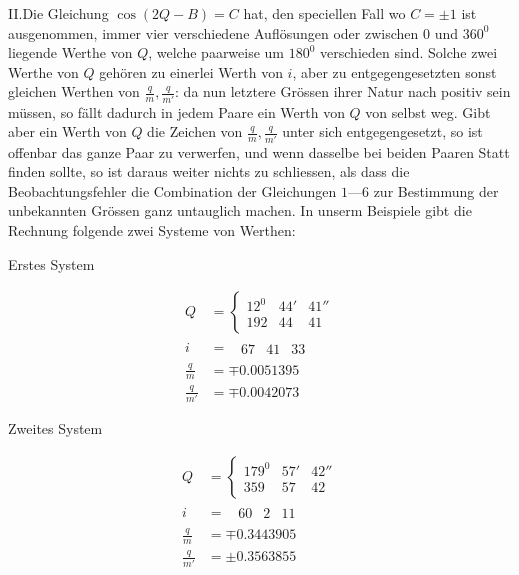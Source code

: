 \par\GaussVSourceGathering{59\textsuperscript{*}}
\par\clearpage
{}
II.\quad Die Gleichung $\cos(2Q-B)=C$ hat, den speciellen Fall wo $C=\pm1$ ist ausgenommen, immer vier verschiedene Auflösungen oder zwischen $0$ und $360^0$ liegende Werthe von $Q$, welche paarweise um $180^0$ verschieden sind. Solche zwei Werthe von $Q$ gehören zu einerlei Werth von $i$, aber zu entgegengesetzten sonst gleichen Werthen von $\frac{q}{m},\frac{q}{m'}$: da nun letztere Grössen ihrer Natur nach positiv sein müssen, so fällt dadurch in jedem Paare ein Werth von $Q$ von selbst weg. Gibt aber ein Werth von $Q$ die Zeichen von $\frac{q}{m},\frac{q}{m'}$ unter sich entgegengesetzt, so ist offenbar das ganze Paar zu verwerfen, und wenn dasselbe bei beiden Paaren Statt finden sollte, so ist daraus weiter nichts zu schliessen, als dass die Beobachtungsfehler die Combination der Gleichungen $1$---$6$ zur Bestimmung der unbekannten Grössen ganz untauglich machen. In unserm Beispiele gibt die Rechnung folgende zwei Systeme von Werthen:
\begin{center}Erstes System\end{center}
\[
\begin{aligned}
Q&=\left\{\begin{array}{rrr}12^0&44'&41''\\192&44&41\end{array}\right.\\
i&=\phantom{\{}\begin{array}{rrr}67&41&33\end{array}\\
\frac{q}{m}&=\mp0.0051395\\
\frac{q}{m'}&=\mp0.0042073
\end{aligned}
\]
\begin{center}Zweites System\end{center}
\[
\begin{aligned}
Q&=\left\{\begin{array}{rrr}179^0&57'&42''\\359&57&42\end{array}\right.\\
i&=\phantom{\{}\begin{array}{rrr}60&2&11\end{array}\\
\frac{q}{m}&=\mp0.3443905\\
\frac{q}{m'}&=\pm0.3563855
\end{aligned}
\]

